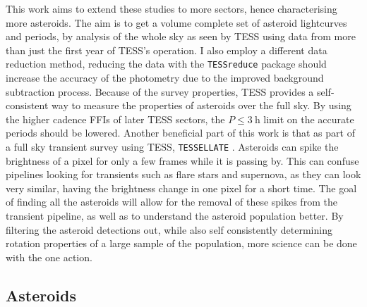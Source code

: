 \documentclass{UCreport}
\begin{document}
This work aims to extend these studies to more sectors, hence characterising more asteroids.
The aim is to get a volume complete set of asteroid lightcurves and periods, by analysis of the whole sky as seen by TESS using data from more than just the first year of TESS's operation.
I also employ a different data reduction method, reducing the data with the \texttt{TESSreduce} package \citep{Ridden-Harper2021} should increase the accuracy of the photometry due to the improved background subtraction process.
Because of the survey properties, TESS provides a self-consistent way to measure the properties of asteroids over the full sky.
By using the higher cadence FFIs of later TESS sectors, the $P\leq\qty{3}{\hour}$ limit on the accurate periods \citep[as found by ][]{McNeill2023} should be lowered.
Another beneficial part of this work is that as part of a full sky transient survey using TESS, \texttt{TESSELLATE} \citep{TESSELLATE}.
Asteroids can spike the brightness of a pixel for only a few frames while it is passing by.
This can confuse pipelines looking for  transients such as flare stars and supernova, as they can look very similar, having the brightness change in one pixel for a short time.
The goal of finding all the asteroids will allow for the removal of these spikes from the transient pipeline, as well as to understand the asteroid population better.
By filtering the asteroid detections out, while also self consistently determining rotation properties of a large sample of the population, more science can be done with the one action.


\subsection{Asteroids}\label{SubSec:Asteroid}
\end{document}
